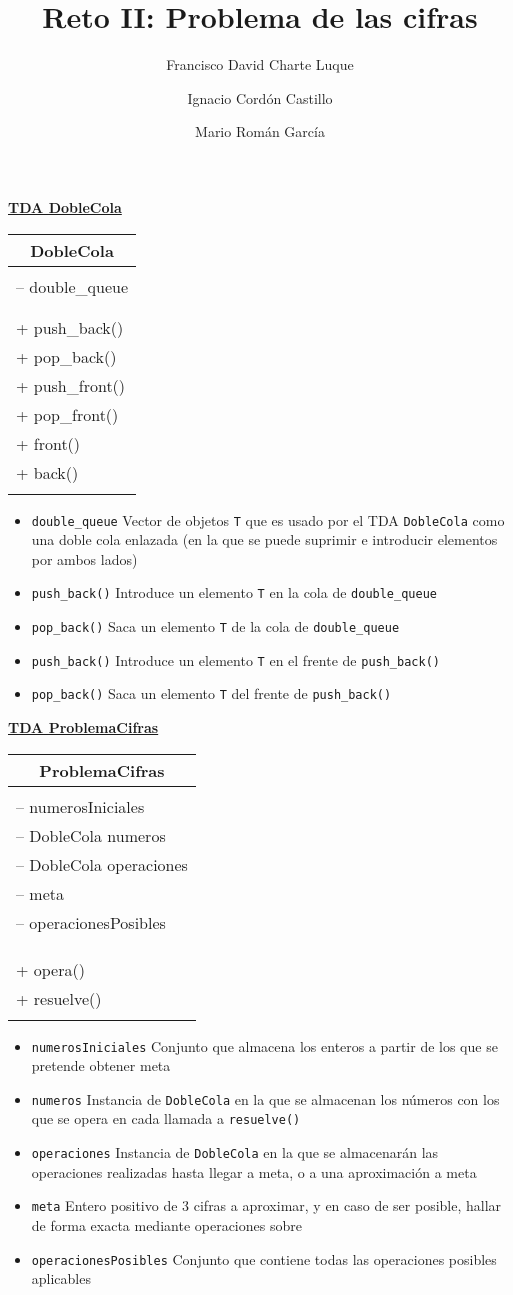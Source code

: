 \documentclass[a4paper,10pt]{scrartcl}
\title{Reto II: Problema de las cifras}
\author{Francisco David Charte Luque \and 
        Ignacio Cordón Castillo \and
        Mario Román García}
\date{}
\def\objeto#1#2#3#4{\underline{\textbf{TDA #1}}
            \begin{center}\begin{tabular}{|p{7cm}|}
                 \hline
                 \multicolumn{1}{|c|}{#1}\\
                 \hline
                 \\#2\\\\
                 \hline
                 \\#3\\\\
                 \hline
            \end{tabular}\end{center}
            \begin{itemize}
            #4
            \end{itemize}
               }
\def\C++#1{\texttt{#1}}
\def\T_{\texttt{T}}
\begin{document}
\maketitle

    \objeto{DobleCola}{-- double\_queue}
                {+ push\_back()\\
                 + pop\_back()\\
                 + push\_front()\\
                 + pop\_front()\\
                 + front()\\
                 + back()}{
 \item \C++{double\_queue} Vector de objetos \T_ que es usado por
  el TDA \C++{DobleCola} como una doble cola enlazada (en la que
  se puede suprimir e introducir elementos por ambos lados)
 \item \C++{push\_back()} Introduce un elemento \T_ en la cola de
  \C++{double\_queue}
 \item \C++{pop\_back()} Saca un elemento \T_ de la cola de 
  \C++{double\_queue}
 \item \C++{push\_back()} Introduce un elemento \T_ en el frente
  de \C++{push\_back()}
 \item \C++{pop\_back()} Saca un elemento \T_ del frente de 
  \C++{push\_back()}}
  
\objeto{ProblemaCifras}{-- numerosIniciales\\
                        -- DobleCola numeros\\
                        -- DobleCola operaciones\\
                        -- meta\\
                        -- operacionesPosibles\\
                        }
                        {+ opera()\\
                        + resuelve()}{
  \item \C++{numerosIniciales} Conjunto que almacena los enteros
   a partir de los que se pretende obtener meta
  \item \C++{numeros} Instancia de \C++{DobleCola} en la que se
   almacenan los números con los que se opera en cada llamada
   a \C++{resuelve()}
  \item \C++{operaciones} Instancia de \C++{DobleCola} en la que
   se almacenarán las operaciones realizadas hasta llegar a meta,
   o a una aproximación a meta
  \item \C++{meta} Entero positivo de 3 cifras a aproximar, y en
   caso de ser posible, hallar de forma exacta mediante operaciones sobre
  \item \C++{operacionesPosibles} Conjunto que contiene todas las
   operaciones posibles aplicables}
  
     
\end{document}
